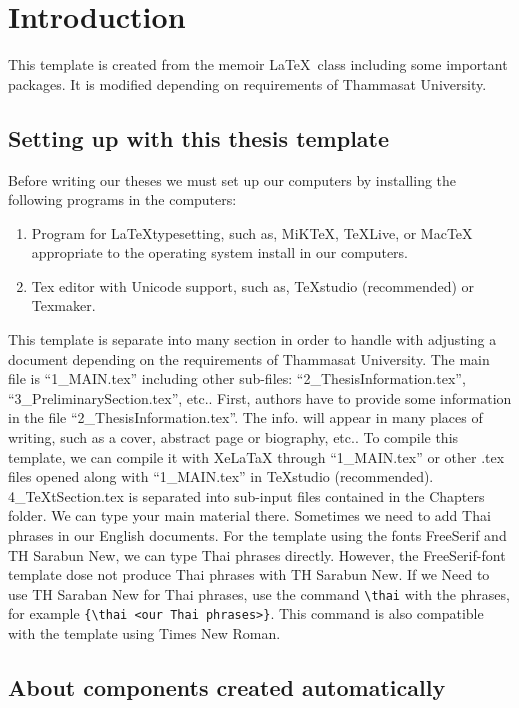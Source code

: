 \chapter{Introduction}


This template is created from the memoir \LaTeX\ class including some important packages. It is modified depending on requirements of Thammasat University.


\section{Setting up with this thesis template}

Before writing our theses we must set up our computers by installing the following programs in the computers:
\begin{enumerate}[\quad1)]
	\item Program for \LaTeX typesetting, such as, MiKTeX, TeXLive, or MacTeX appropriate to the operating system install in our computers.
	\item Tex editor with Unicode support, such as, TeXstudio (recommended) or Texmaker.
\end{enumerate}
This template is separate into many section in order to handle with adjusting a document depending on the requirements of Thammasat University. The main file is “1\_MAIN.tex” including other sub-files: “2\_ThesisInformation.tex”, “3\_PreliminarySection.tex”, etc.. First, authors have to provide some information in the file “2\_ThesisInformation.tex”. The info. will appear in many places of writing, such as a cover, abstract page or biography, etc.. To compile this template, we can compile it with XeLaTaX through “1\_MAIN.tex” or other .tex files opened along with “1\_MAIN.tex” in TeXstudio (recommended). 4\_TeXtSection.tex is separated into sub-input files contained in the Chapters folder. We can type your main material there.
Sometimes we need to add Thai phrases in our English documents. For the template using the fonts FreeSerif and TH Sarabun New, we can type Thai phrases directly. However, the FreeSerif-font template dose not produce Thai phrases with TH Sarabun New. If we Need to use TH Saraban New for Thai phrases, use the command \verb|\thai| with the phrases, for example \verb|{\thai <our Thai phrases>}|. This command is also compatible with the template using Times New Roman.




\section{About components created automatically}

